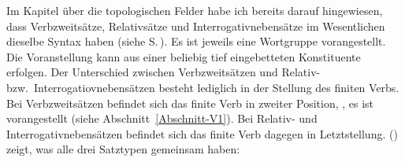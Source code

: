 Im Kapitel über die topologischen Felder habe ich bereits darauf hingewiesen, dass Verbzweitsätze,
Relativsätze und Interrogativnebensätze im Wesentlichen dieselbe Syntax haben (siehe
S.\,\pageref{Seite-Relativsätze-Interrogativnebensätze}). Es ist jeweils eine Wortgruppe
vorangestellt. Die Voranstellung kann aus einer beliebig tief eingebetteten Konstituente 
erfolgen. Der Unterschied zwischen Verbzweitsätzen und Relativ- bzw.\ Interrogatiovnebensätzen
besteht lediglich in der Stellung des finiten Verbs. Bei Verbzweitsätzen befindet sich das finite
Verb in zweiter Position, \dash, es ist vorangestellt (siehe Abschnitt~\ref{Abschnitt-V1}). Bei Relativ- und
Interrogativnebensätzen befindet sich das finite Verb dagegen in Letztstellung. () zeigt, was
alle drei Satztypen gemeinsam haben:
\ea
\label{type-filler-phrase}%
 \impl\\

